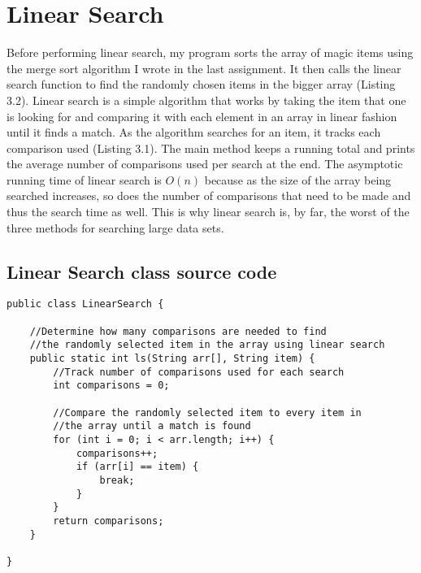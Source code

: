 \documentclass[letterpaper, 10pt,DIV=13]{scrartcl}
\numberwithin{equation}{section} %
\numberwithin{figure}{section} %
\numberwithin{table}{section} %
\begin{document}
\section{Linear Search}
Before performing linear search, my program sorts the array of magic items using the merge sort algorithm I wrote in the last assignment. It then calls the linear search function to find the randomly chosen items in the bigger array (Listing 3.2). Linear search is a simple algorithm that works by taking the item that one is looking for and comparing it with each element in an array in linear fashion until it finds a match. As the algorithm searches for an item, it tracks each comparison used (Listing 3.1). The main method keeps a running total and prints the average number of comparisons used per search at the end. The asymptotic running time of linear search is $O(n)$ because as the size of the array being searched increases, so does the number of comparisons that need to be made and thus the search time as well. This is why linear search is, by far, the worst of the three methods for searching large data sets.

\subsection{Linear Search class source code}
\lstset{numbers=left, numberstyle=\tiny, stepnumber=1, numbersep=5pt, basicstyle=\footnotesize\ttfamily}
\begin{lstlisting}[frame=single, ] 
public class LinearSearch {

    //Determine how many comparisons are needed to find 
    //the randomly selected item in the array using linear search
    public static int ls(String arr[], String item) {
        //Track number of comparisons used for each search
        int comparisons = 0;
        
        //Compare the randomly selected item to every item in
        //the array until a match is found
        for (int i = 0; i < arr.length; i++) {
            comparisons++;
            if (arr[i] == item) {
                break;
            }
        }
        return comparisons;
    }
    
}
\end{lstlisting}
\end{document}
